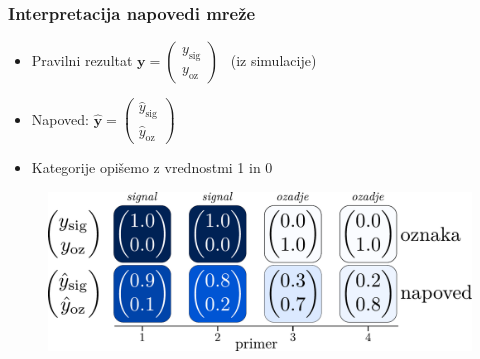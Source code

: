 \documentclass[14pt, t]{beamer}
\renewcommand{\vec}[1]{\bm{#1}}
\newcommand{\y}{\vec{y}}
\begin{document}
\begin{frame}
    \frametitle{Interpretacija napovedi mreže}
    \begin{itemize}
    
        \item Pravilni rezultat
        $ \vec{y} = 
        \begin{pmatrix}
            y_{\text{sig}}\\[-0.5mm]
            y_{\text{oz}}
        \end{pmatrix} $ \ {\small (iz simulacije)}

        \item Napoved: \hspace{-1.0mm}
        $ \hat{\y} = 
        \begin{pmatrix}
            \hat{y}_{\text{sig}}\\[-0.5mm]
            \hat{y}_{\text{oz}}
        \end{pmatrix} $

        \item Kategorije opišemo z vrednostmi 1 in 0
        
    \end{itemize}
    
    \begin{figure}[htb!]
        \centering
        \includegraphics[width=\linewidth]{vector/figures-slo/binary-output.pdf}
    \end{figure}
    
\end{frame}


    
        
\end{document}
